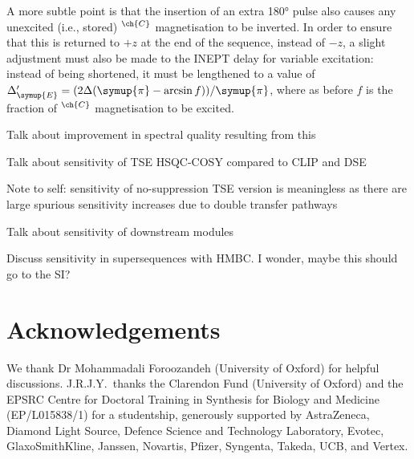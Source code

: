 \documentclass[a4paper,12pt]{article}
\newcommand{\meshort}{J.R.J.Y.}
\newcommand{\DeltaE}{\Delta_{\symup{E}}}
\newcommand{\magn}[1]{\ch{^1H}$^{\ch{#1}}$}
\newcommand{\todo}[1]{{\color{OrangeRed}#1}}
\newcommand{\cpi}{\symup{\pi}}
\begin{document}
\begin{refsection}
A more subtle point is that the insertion of an extra \ang{180} pulse also causes any unexcited (i.e., stored) \magn{C} magnetisation to be inverted.
In order to ensure that this is returned to $+z$ at the end of the sequence, instead of $-z$, a slight adjustment must also be made to the INEPT delay for variable excitation: instead of being shortened, it must be lengthened to a value of $\DeltaE' = (2\Delta (\cpi - \arcsin f))/\cpi$, where as before $f$ is the fraction of \magn{C} magnetisation to be excited.

\todo{Talk about improvement in spectral quality resulting from this}

\todo{Talk about sensitivity of TSE HSQC-COSY compared to CLIP and DSE}

\todo{Note to self: sensitivity of no-suppression TSE version is meaningless as there are large spurious sensitivity increases due to double transfer pathways}

\todo{Talk about sensitivity of downstream modules}

\todo{Discuss sensitivity in supersequences with HMBC. I wonder, maybe this should go to the SI?}


\section*{Acknowledgements}

We thank Dr Mohammadali Foroozandeh (University of Oxford) for helpful discussions.
\meshort{}\ thanks the Clarendon Fund (University of Oxford) and the EPSRC Centre for Doctoral Training in Synthesis for Biology and Medicine (EP/L015838/1) for a studentship, generously supported by AstraZeneca, Diamond Light Source, Defence Science and Technology Laboratory, Evotec, GlaxoSmithKline, Janssen, Novartis, Pfizer, Syngenta, Takeda, UCB, and Vertex.

\AtNextBibliography{\small}
\printbibliography{}
\end{refsection}


\end{document}
